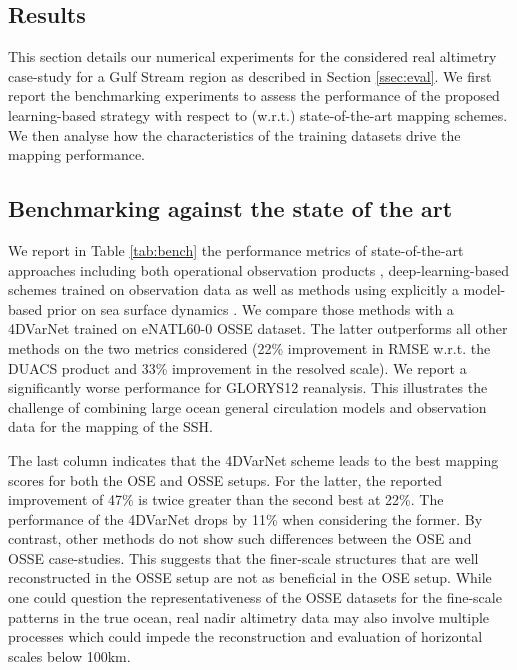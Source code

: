 \begin{bibunit}
\section{Results}
\label{sec:results}

This section details our numerical experiments for the considered real altimetry case-study for a Gulf Stream region as described in Section \ref{ssec:eval}. We first report the benchmarking experiments to assess the performance of the proposed learning-based strategy with respect to (w.r.t.) state-of-the-art mapping schemes. We then analyse how the characteristics of the training datasets drive the mapping performance. 

\subsection{Benchmarking against the state of the art}
\label{ssec:benchmarks}

We report in Table \ref{tab:bench} the performance metrics of state-of-the-art approaches including both operational observation products \cite{taburetDUACSDT2018252019,ubelmannReconstructingOceanSurface2021}, deep-learning-based schemes trained on observation data \cite{archambaultMultimodalUnsupervisedSpatioTemporal2023,martinSynthesizingSeaSurface2023} as well as methods using explicitly a model-based prior on sea surface dynamics \cite{guillouMappingAltimetryForthcoming2021,ballarottaDynamicMappingAlongTrack2020,jean-michelCopernicusGlobal122021}. We compare those methods with a 4DVarNet trained on eNATL60-0 OSSE dataset. The latter outperforms all other methods on the two metrics considered (22\% improvement in RMSE w.r.t. the DUACS product and 33\% improvement in the resolved scale). We report a significantly worse performance for GLORYS12 reanalysis. This illustrates the challenge of combining large ocean general circulation models and observation data for the mapping of the SSH.


The last column indicates that the 4DVarNet scheme leads to the best mapping scores for both the OSE and OSSE setups. For the latter, the reported improvement of 47\% is twice greater than the second best at 22\%. The performance of the 4DVarNet drops by 11\% when considering the former. By contrast, other methods do not show such differences between the OSE and OSSE case-studies. This suggests that the finer-scale structures that are well reconstructed in the OSSE setup are not as beneficial in the OSE setup. While one could question the representativeness of the OSSE datasets for the fine-scale patterns in the true ocean, real nadir altimetry data may also involve multiple processes which could impede the reconstruction and evaluation of horizontal scales below 100km.  




\end{bibunit}
